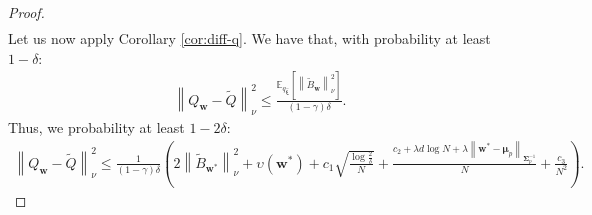 \documentclass{article}
\newcommand{\wt}[1]{\widetilde{#1}}
\newcommand{\wh}[1]{\widehat{#1}}
\newcommand{\norm}[1]{\left\lVert #1 \right\rVert}
\begin{document}
\begin{proof}
\begin{align*}
\end{align*}
Let us now apply Corollary \ref{cor:diff-q}. We have that, with probability at least $1-\delta$:
\begin{align*}
\norm{Q_{\bm{w}} - \wt{Q}}_{\nu}^2 \leq \frac{\mathbb{E}_{q_{\wh{\bm{\xi}}}}\left[ \norm{\wt B_{\bm{w}}}_{\nu}^2 \right ]}{(1-\gamma)\delta}.
\end{align*}
Thus, we probability at least $1-2\delta$:
\begin{align*}
\norm{Q_{\bm{w}} - \wt{Q}}_{\nu}^2 \leq \frac{1}{(1-\gamma)\delta}\left(2\norm{\wt{B}_{\bm{w}^{*}}}_{\nu}^2 + \upsilon(\bm{w}^*) + c_1\sqrt{\frac{\log\frac{2}{\delta}}{N}} + \frac{c_2 + \lambda d \log N + \lambda\norm{\bm{w}^* - \bm{\mu}_p}_{\bm{\Sigma}_p^{-1}}}{N} + \frac{c_3}{N^2}\right).
\end{align*}
\end{proof}
\end{document}
